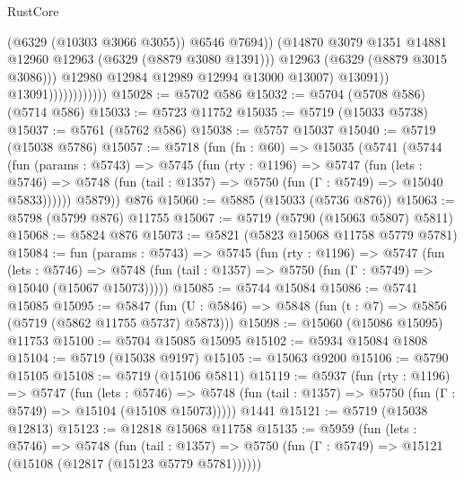 \begin{lexlean}{RustCore}
\begin{coremodule}
                                        (@6329 (@10303 @3066 @3055))
                                        @6546
                                        @7694))
                                    (@14870
                                      @3079
                                      @1351
                                      @14881
                                      @12960
                                      @12963
                                      (@6329 (@8879 @3080 @1391)))
                                    @12963
                                    (@6329 (@8879 @3015 @3086)))
                                  @12980
                                  @12984
                                  @12989
                                  @12994
                                  @13000
                                  @13007)
                                @13091))
                            @13091))))))))))))
@15028 := @5702 @586
@15032 := @5704 (@5708 @586) (@5714 @586)
@15033 := @5723 @11752
@15035 := @5719 (@15033 @5738)
@15037 := @5761 (@5762 @586)
@15038 := @5757 @15037
@15040 := @5719 (@15038 @5786)
@15057 := @5718
    (fun (fn : @60) =>
    @15035
      (@5741
        (@5744
          (fun (params : @5743) =>
          @5745
            (fun (rty : @1196) =>
            @5747
              (fun (lets : @5746) =>
              @5748 (fun (tail : @1357) => @5750 (fun (Γ : @5749) => @15040 @5833))))))
        @5879))
    @876
@15060 := @5885 (@15033 (@5736 @876))
@15063 := @5798 (@5799 @876) @11755
@15067 := @5719 (@5790 (@15063 @5807) @5811)
@15068 := @5824 @876
@15073 := @5821 (@5823 @15068 @11758 @5779 @5781)
@15084 := fun (params : @5743) =>
  @5745
    (fun (rty : @1196) =>
    @5747
      (fun (lets : @5746) =>
      @5748 (fun (tail : @1357) => @5750 (fun (Γ : @5749) => @15040 (@15067 @15073)))))
@15085 := @5744 @15084
@15086 := @5741 @15085
@15095 := @5847
    (fun (U : @5846) => @5848 (fun (t : @7) => @5856 (@5719 (@5862 @11755 @5737) @5873)))
@15098 := @15060 (@15086 @15095) @11753
@15100 := @5704 @15085 @15095
@15102 := @5934 @15084 @1808
@15104 := @5719 (@15038 @9197)
@15105 := @15063 @9200
@15106 := @5790 @15105
@15108 := @5719 (@15106 @5811)
@15119 := @5937
    (fun (rty : @1196) =>
    @5747
      (fun (lets : @5746) =>
      @5748 (fun (tail : @1357) => @5750 (fun (Γ : @5749) => @15104 (@15108 @15073)))))
    @1441
@15121 := @5719 (@15038 @12813)
@15123 := @12818 @15068 @11758
@15135 := @5959
    (fun (lets : @5746) =>
    @5748
      (fun (tail : @1357) =>
      @5750 (fun (Γ : @5749) => @15121 (@15108 (@12817 (@15123 @5779 @5781))))))

\end{coremodule}
\end{lexlean}
